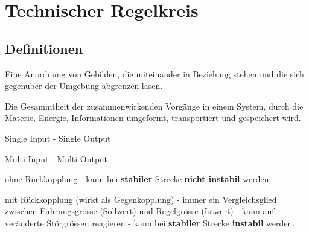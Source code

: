 \section{Technischer Regelkreis}
\subsection{Definitionen }

\begin{description}[leftmargin=2.5cm]
 \item[System] Eine Anordnung von Gebilden, die miteinander in Beziehung stehen
        	   und die sich gegenüber der Umgebung abgrenzen lasen.
 \item[Prozess] Die Gesammtheit der zusammenwirkenden Vorgänge in einem System,
        		durch die Materie, Energie, Informationen umgeformt, transportiert und
        		gespeichert wird.
 \item[SISO] Single Input - Single Output
 \item[MIMO] Multi Input - Multi Output
 \item[Steuerung] ohne Rückkopplung \newline
 				  - kann bei \textbf{stabiler} Strecke \textbf{nicht instabil} werden
 \item[Regelung] mit Rückkopplung (wirkt als Gegenkopplung) \newline
 				 - immer ein Vergleichsglied zwischen Führungsgrösse (Sollwert) und
 				 Regelgrösse (Istwert) \newline
 				 - kann auf veränderte Störgrössen reagieren \newline
 				 - kann bei \textbf{stabiler} Strecke \textbf{instabil} werden.
\end{description}

